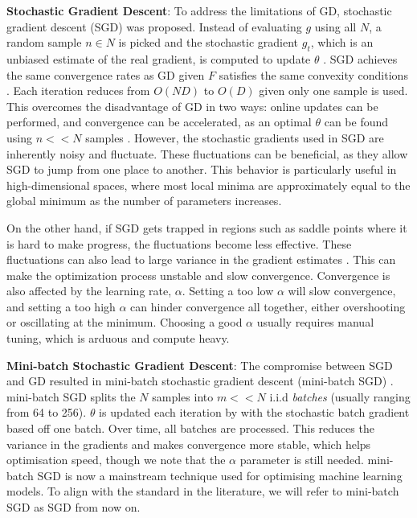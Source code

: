 \textbf{Stochastic Gradient Descent}: To address the limitations of GD, stochastic gradient descent (SGD) was proposed. Instead of evaluating $g$ using all $N$, a random sample $n \in N$ is picked and the stochastic gradient $g_t$, which is an unbiased estimate of the real gradient, is computed to update $\theta$ \citep{robbins1951stochastic}. SGD achieves the same convergence rates as GD given $F$ satisfies the same convexity conditions \citep{johnson2013accelerating, nemirovski2009robust}. Each iteration reduces from $O(ND)$ to $O(D)$ given only one sample is used.
This overcomes the disadvantage of GD in two ways: online updates can be performed, and convergence can be accelerated, as an optimal $\theta$ can be found using $n << N$ samples \citep{johnson2013accelerating, nemirovski2009robust}. However, the stochastic gradients used in SGD are inherently noisy and fluctuate. These fluctuations can be beneficial, as they allow SGD to jump from one place to another. This behavior is particularly useful in high-dimensional spaces, where most local minima are approximately equal to the global minimum as the number of parameters increases.

On the other hand, if SGD gets trapped in regions such as saddle points where it is hard to make progress, the fluctuations become less effective. These fluctuations can also lead to large variance in the gradient estimates \citep{sun2019survey}. This can make the optimization process unstable and slow convergence. Convergence is also affected by the learning rate, $\alpha$. Setting a too low $\alpha$ will slow convergence, and setting a too high $\alpha$ can hinder convergence all together, either overshooting or oscillating at the minimum. Choosing a good $\alpha$ usually requires manual tuning, which is arduous and compute heavy.

\textbf{Mini-batch Stochastic Gradient Descent}: The compromise between SGD and GD resulted in mini-batch stochastic gradient descent (mini-batch SGD) \citep{robbins1951stochastic}. mini-batch SGD splits the $N$ samples into $m << N$ i.i.d \textit{batches} (usually ranging from 64 to 256). $\theta$ is updated each iteration by with the stochastic batch gradient based off one batch. Over time, all batches are processed. This reduces the variance in the gradients and makes convergence more stable, which helps optimisation speed, though we note that the $\alpha$ parameter is still needed. mini-batch SGD is now a mainstream technique used for optimising machine learning models. To align with the standard in the literature, we will refer to mini-batch SGD as SGD from now on.

